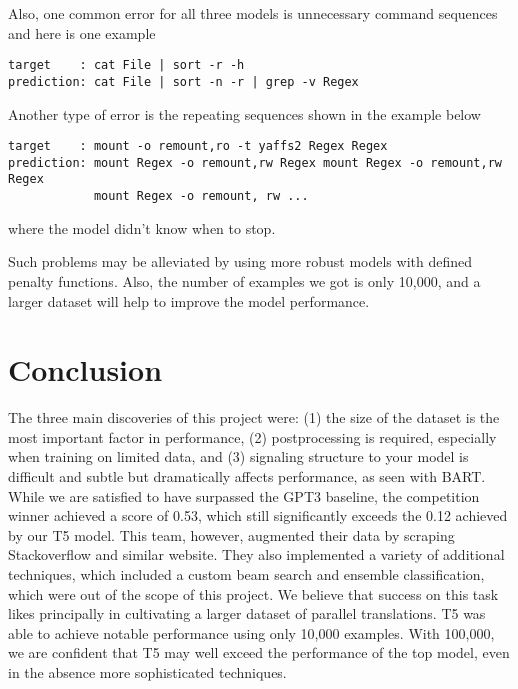\documentclass{article}
\begin{document}
Also, one common error for all three models is unnecessary command sequences and here is one example
\begin{verbatim}
target    : cat File | sort -r -h 
prediction: cat File | sort -n -r | grep -v Regex
\end{verbatim}
Another type of error is the repeating sequences shown in the example below
\begin{verbatim}
target    : mount -o remount,ro -t yaffs2 Regex Regex 
prediction: mount Regex -o remount,rw Regex mount Regex -o remount,rw Regex 
            mount Regex -o remount, rw ...
\end{verbatim}
where the model didn't know when to stop.

Such problems may be alleviated by using more robust models with defined penalty functions. Also, the number of examples we got is only 10,000, and a larger dataset will help to improve the model performance.

\section{Conclusion}
The three main discoveries of this project were: (1) the size of the dataset is
the most important factor in performance, (2) postprocessing is required,
especially when training on limited data, and (3) signaling structure to your
model is difficult and subtle but dramatically affects performance, as seen
with BART. While we are satisfied to have surpassed the GPT3 baseline, the
competition winner achieved a score of 0.53, which still significantly exceeds
the 0.12 achieved by our T5 model. This team, however, augmented their data by
scraping Stackoverflow and similar website. They also implemented a variety of
additional techniques, which included a custom beam search and ensemble
classification, which were out of the scope of this project. We believe that
success on this task likes principally in cultivating a larger dataset of
parallel translations. T5 was able to achieve notable performance using only
10,000 examples. With 100,000, we are confident that T5 may well exceed the
performance of the top model, even in the absence more sophisticated
techniques.




\end{document}

